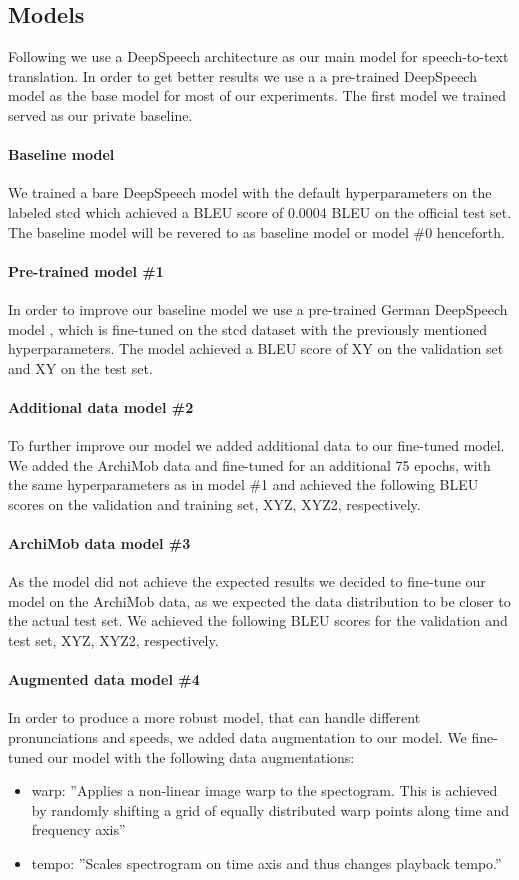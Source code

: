 \subsection{Models}
Following  we use a DeepSpeech architecture \cite{Hannun2014DeepSS} as our main model for speech-to-text translation. In order to get better results we use a
a pre-trained DeepSpeech model \cite{DeepSpeechGerman090} as the base model for most of our experiments. The first model we trained served as our private baseline. \paragraph{Baseline model} We trained a bare DeepSpeech model with the default hyperparameters
on the labeled \gls{stcd} which achieved a BLEU score of 0.0004 BLEU on the official test set. The baseline model will be revered to as baseline model or model \#0 henceforth.\paragraph{Pre-trained model \#1} In order to improve our baseline model we use a pre-trained
German DeepSpeech model \cite{DeepSpeechGerman090}, which is fine-tuned on the \gls{stcd} dataset with the previously mentioned hyperparameters. The model achieved a BLEU score of
XY on the validation set and XY on the test set.
\paragraph{Additional data model \#2} To further improve our  model we added additional data to our fine-tuned model. We added the ArchiMob data and fine-tuned for an additional 75 epochs, with
the same hyperparameters as in model \#1 and achieved the following BLEU scores on the validation and training set, XYZ, XYZ2, respectively.
\paragraph{ArchiMob data model \#3} As the  model did not achieve the expected results we decided to fine-tune our model on the ArchiMob data, as we expected the data distribution to be closer
to the actual test set. We achieved the following BLEU scores for the validation and test set, XYZ, XYZ2,
respectively.
\paragraph{Augmented data model \#4} In order to produce a more robust model, that can handle different pronunciations and speeds, we added data augmentation to our  model. We fine-tuned our
model with the following data augmentations:
\begin{itemize}
    \item warp: ''Applies a non-linear image warp to the spectogram. This is achieved by randomly shifting a grid of equally distributed warp points along time and frequency axis''
    \cite{DeepSpeechAugmentation}
    \item tempo: ''Scales spectrogram on time axis and thus changes playback tempo.'' \cite{DeepSpeechAugmentation}
\end{itemize}

